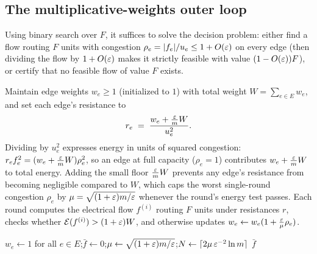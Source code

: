 \subsection{The multiplicative-weights outer loop}\label{ch41:mwu}

Using binary search over $F$, it suffices to solve the decision problem: either find a flow routing $F$ units with congestion $\rho_e = \lvert f_e\rvert/u_e \le 1 + O(\varepsilon)$ on every edge (then dividing the flow by $1 + O(\varepsilon)$ makes it strictly feasible with value $(1 - O(\varepsilon))F$), or certify that no feasible flow of value $F$ exists.

Maintain edge weights $w_e \ge 1$ (initialized to $1$) with total weight $W = \sum_{e \in E} w_e$, and set each edge's resistance to
\[
  r_e \;=\; \frac{w_e + \frac{\varepsilon}{m}W}{u_e^2} .
\]
Dividing by $u_e^2$ expresses energy in units of squared congestion: $r_e f_e^2 = (w_e + \frac{\varepsilon}{m}W)\rho_e^2$, so an edge at full capacity ($\rho_e = 1$) contributes $w_e + \frac{\varepsilon}{m}W$ to total energy. Adding the small floor $\frac{\varepsilon}{m}W$ prevents any edge's resistance from becoming negligible compared to $W$, which caps the worst single-round congestion $\rho_e$ by $\mu = \sqrt{(1+\varepsilon)m/\varepsilon}$ whenever the round's energy test passes. Each round computes the electrical flow $f^{(i)}$ routing $F$ units under resistances $r$, checks whether $\mathcal{E}(f^{(i)}) > (1+\varepsilon)W$, and otherwise updates $w_e \gets w_e(1 + \frac{\varepsilon}{\mu}\rho_e)$.

\begin{algorithm}[htbp]
\DontPrintSemicolon
\caption{\textsc{ElectricalMaxFlow}$(\Gph,u,s,t,F,\eps)$}\label{ch41:alg-maxflow}
$w_e\gets 1$ for all $e \in E$;\quad $\bar f\gets 0$;\quad $\mu \gets \sqrt{(1+\varepsilon)m/\varepsilon}$;\quad $N\gets \lceil 2\mu\,\varepsilon^{-2}\ln m \rceil$\;
\Return $\bar f$ 
\end{algorithm}

